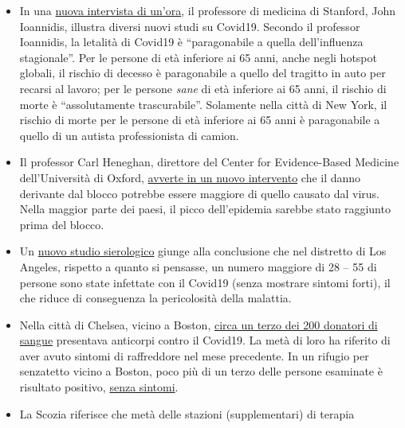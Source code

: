 \begin{itemize}
\tightlist
\item
  In una \href{https://www.youtube.com/watch?v=cwPqmLoZA4s}{nuova
  intervista di un'ora}, il professore di medicina di Stanford, John
  Ioannidis, illustra diversi nuovi studi su Covid19. Secondo il
  professor Ioannidis, la letalità di Covid19 è ``paragonabile a quella
  dell'influenza stagionale''. Per le persone di età inferiore ai 65
  anni, anche negli hotspot globali, il rischio di decesso è
  paragonabile a quello del tragitto in auto per recarsi al lavoro; per
  le persone \emph{sane} di età inferiore ai 65 anni, il rischio di
  morte è ``assolutamente trascurabile''. Solamente nella città di New
  York, il rischio di morte per le persone di età inferiore ai 65 anni è
  paragonabile a quello di un autista professionista di camion.
\item
  Il professor Carl Heneghan, direttore del Center for Evidence-Based
  Medicine dell'Università di Oxford,
  \href{https://news.yahoo.com/lockdown-damage-outweighs-coronavirus-warning-121940675.html}{avverte
  in un nuovo intervento} che il danno derivante dal blocco potrebbe
  essere maggiore di quello causato dal virus. Nella maggior parte dei
  paesi, il picco dell'epidemia sarebbe stato raggiunto prima del
  blocco.
\item
  Un
  \href{http://publichealth.lacounty.gov/phcommon/public/media/mediapubhpdetail.cfm?prid=2328}{nuovo
  studio sierologico} giunge alla conclusione che nel distretto di Los
  Angeles, rispetto a quanto si pensasse, un numero maggiore di 28 -- 55
  di persone sono state infettate con il Covid19 (senza mostrare sintomi
  forti), il che riduce di conseguenza la pericolosità della malattia.
\item
  Nella città di Chelsea, vicino a Boston,
  \href{https://archive.is/20200418222442/https:/www.bostonglobe.com/2020/04/17/business/nearly-third-200-blood-samples-taken-chelsea-show-exposure-coronavirus/}{circa
  un terzo dei 200 donatori di sangue} presentava anticorpi contro il
  Covid19. La metà di loro ha riferito di aver avuto sintomi di
  raffreddore nel mese precedente. In un rifugio per senzatetto vicino a
  Boston, poco più di un terzo delle persone esaminate è risultato
  positivo,
  \href{https://www.wsbtv.com/news/trending/coronavirus-cdc-reviewing-stunning-universal-testing-results-boston-homeless-shelter/ZADQ45HCAZEVJAZA3OTCUR7M6M/}{senza
  sintomi}.
\item
  La Scozia riferisce che metà delle stazioni (supplementari) di terapia

\end{itemize}
